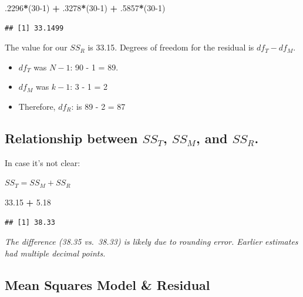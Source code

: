 \documentclass[
  english,
]{book}
\newenvironment{Shaded}{\begin{snugshade}}{\end{snugshade}}
\newcommand{\DecValTok}[1]{\textcolor[rgb]{0.00,0.00,0.81}{#1}}
\newcommand{\FloatTok}[1]{\textcolor[rgb]{0.00,0.00,0.81}{#1}}
\newcommand{\NormalTok}[1]{#1}
\newcommand{\OperatorTok}[1]{\textcolor[rgb]{0.81,0.36,0.00}{\textbf{#1}}}
\newcommand{\StringTok}[1]{\textcolor[rgb]{0.31,0.60,0.02}{#1}}
\providecommand{\tightlist}{%
  \setlength{\itemsep}{0pt}\setlength{\parskip}{0pt}}
\begin{document}
\begin{Shaded}
\begin{Highlighting}[]
\FloatTok{.2296}\OperatorTok{*}\NormalTok{(}\DecValTok{30-1}\NormalTok{) }\OperatorTok{+}\StringTok{ }\FloatTok{.3278}\OperatorTok{*}\NormalTok{(}\DecValTok{30-1}\NormalTok{) }\OperatorTok{+}\StringTok{ }\FloatTok{.5857}\OperatorTok{*}\NormalTok{(}\DecValTok{30-1}\NormalTok{)}
\end{Highlighting}
\end{Shaded}

\begin{verbatim}
## [1] 33.1499
\end{verbatim}

The value for our \(SS_R\) is 33.15. Degrees of freedom for the residual is \(df_T - df_M\).

\begin{itemize}
\tightlist
\item
  \(df_T\) was \(N-1\): 90 - 1 = 89.
\item
  \(df_M\) was \(k - 1\): 3 - 1 = 2
\item
  Therefore, \(df_R\): is 89 - 2 = 87
\end{itemize}

\hypertarget{relationship-between-ss_t-ss_m-and-ss_r.}{%
\subsection{\texorpdfstring{Relationship between \(SS_T\), \(SS_M\), and \(SS_R\).}{Relationship between SS\_T, SS\_M, and SS\_R.}}\label{relationship-between-ss_t-ss_m-and-ss_r.}}

In case it's not clear:

\(SS_T = SS_M + SS_R\)

\begin{Shaded}
\begin{Highlighting}[]
\FloatTok{33.15} \OperatorTok{+}\StringTok{ }\FloatTok{5.18}
\end{Highlighting}
\end{Shaded}

\begin{verbatim}
## [1] 38.33
\end{verbatim}

\emph{The difference (38.35 vs.~38.33) is likely due to rounding error. Earlier estimates had multiple decimal points.}

\hypertarget{mean-squares-model-residual}{%
\subsection{Mean Squares Model \& Residual}\label{mean-squares-model-residual}}
\end{document}
